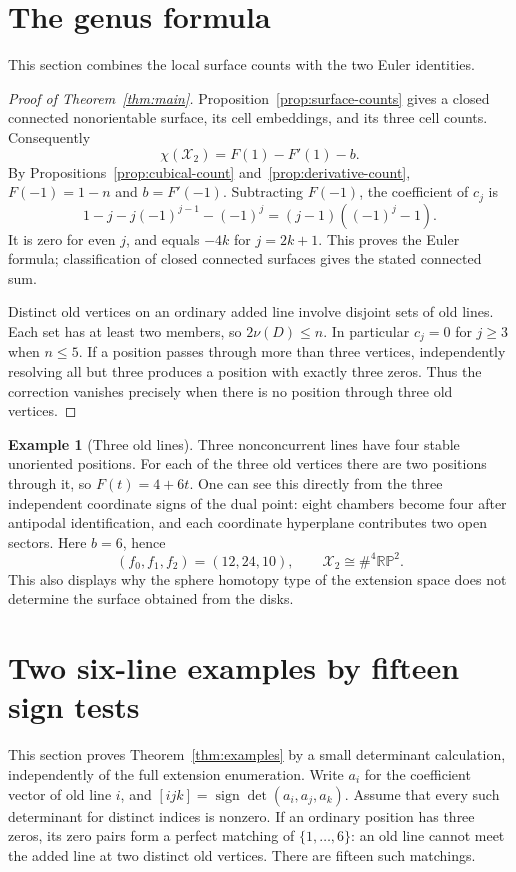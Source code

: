 \documentclass[11pt]{article}
\theoremstyle{definition}\newtheorem{definition}[theorem]{Definition}
\newtheorem{example}[theorem]{Example}
\newcommand{\RP}{\mathbb{RP}}
\begin{document}
\section{The genus formula}\label{sec:genus}
This section combines the local surface counts with the two Euler identities.
\begin{proof}[Proof of Theorem~\ref{thm:main}]
Proposition~\ref{prop:surface-counts} gives a closed connected
nonorientable surface, its cell embeddings, and its three cell counts.
Consequently
\[
 \chi(\mathcal X_2)=F(1)-F'(1)-b.
\]
By Propositions~\ref{prop:cubical-count} and~\ref{prop:derivative-count},
$F(-1)=1-n$ and $b=F'(-1)$. Subtracting $F(-1)$, the coefficient of
$c_j$ is
\[
 1-j-j(-1)^{j-1}-(-1)^j=(j-1)((-1)^j-1).
\]
It is zero for even $j$, and equals $-4k$ for $j=2k+1$.
This proves the Euler formula; classification of closed connected
surfaces gives the stated connected sum.

Distinct old vertices on an ordinary added line involve disjoint
sets of old lines. Each set has at least two members, so
$2\nu(D)\leq n$. In particular $c_j=0$ for $j\geq3$ when $n\leq5$.
If a position passes through more than three vertices, independently
resolving all but three produces a position with exactly three zeros.
Thus the correction vanishes precisely when there is no position
through three old vertices.
\end{proof}

\begin{example}[Three old lines]
Three nonconcurrent lines have four stable unoriented positions.
For each of the three old vertices there are two positions through it,
so $F(t)=4+6t$. One can see this directly from the three independent
coordinate signs of the dual point: eight chambers become four after
antipodal identification, and each coordinate hyperplane contributes
two open sectors. Here $b=6$, hence
\[
 (f_0,f_1,f_2)=(12,24,10),\qquad \mathcal X_2\cong\#^4\RP^2.
\]
This also displays why the sphere homotopy type of the extension space
does not determine the surface obtained from the disks.
\end{example}

\section{Two six-line examples by fifteen sign tests}\label{sec:six}
This section proves Theorem~\ref{thm:examples} by a small determinant
calculation, independently of the full extension enumeration.
Write $a_i$ for the coefficient vector of old line $i$, and
$[ijk]=\operatorname{sign}\det(a_i,a_j,a_k)$.
Assume that every such determinant for distinct indices is nonzero.
If an ordinary position has three zeros, its zero pairs form a perfect
matching of $\{1,\ldots,6\}$: an old line cannot meet the added line
at two distinct old vertices. There are fifteen such matchings.
\end{document}
